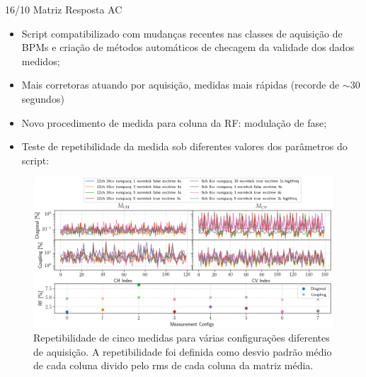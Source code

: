\documentclass{beamer}					  %
\begin{document}
\begin{frame}{16/10 Matriz Resposta AC}
    \scriptsize{
    \begin{itemize}
        \item Script compatibilizado com mudanças recentes nas classes de aquisição de BPMs e criação de métodos automáticos de checagem da validade dos dados medidos;
        \item Mais corretoras atuando por aquisição, medidas mais rápidas (recorde de $\sim30$ segundos)
        \item Novo procedimento de medida para coluna da RF: modulação de fase;
        \item Teste de repetibilidade da medida sob diferentes valores dos parâmetros do script:
	\end{itemize}}
     \begin{figure}[H]
		\centering
        \includegraphics[width=.9\textwidth]{2023-10-27/figures/meas_repetability.png}
        \caption*{{\tiny Repetibilidade de cinco medidas para várias configurações diferentes de aquisição. A repetibilidade foi definida como desvio padrão médio de cada coluna divido pelo rms de cada coluna da matriz média.}}
        \label{fig:figure1}
    \end{figure}
\end{frame}
\end{document}
